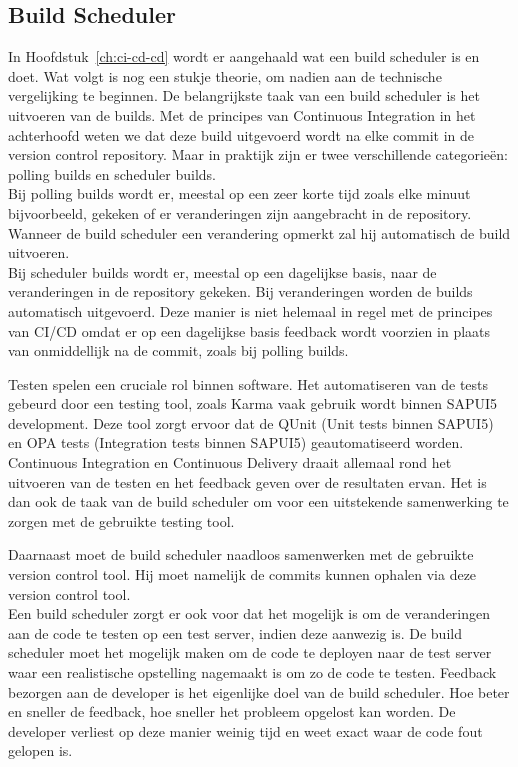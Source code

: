        \subsection{Build Scheduler}
        In Hoofdstuk~\ref{ch:ci-cd-cd} wordt er aangehaald wat een build scheduler is en doet. Wat volgt is nog een stukje theorie, om nadien aan de technische vergelijking te beginnen.
        De belangrijkste taak van een build scheduler is het uitvoeren van de builds. Met de principes van Continuous Integration in het achterhoofd weten we dat deze build uitgevoerd wordt na elke commit in de version control repository. Maar in praktijk zijn er twee verschillende categorieën: polling builds en scheduler builds.\\
        Bij polling builds wordt er, meestal op een zeer korte tijd zoals elke minuut bijvoorbeeld, gekeken of er veranderingen zijn aangebracht in de repository. Wanneer de build scheduler een verandering opmerkt zal hij automatisch de build uitvoeren.\\
        Bij scheduler builds wordt er, meestal op een dagelijkse basis, naar de veranderingen in de repository gekeken. Bij veranderingen worden de builds automatisch uitgevoerd. Deze manier is niet helemaal in regel met de principes van CI/CD omdat er op een dagelijkse basis feedback wordt voorzien in plaats van onmiddellijk na de commit, zoals bij polling builds.
        
        Testen spelen een cruciale rol binnen software. Het automatiseren van de tests gebeurd door een testing tool, zoals Karma vaak gebruik wordt binnen SAPUI5 development. Deze tool zorgt ervoor dat de QUnit (Unit tests binnen SAPUI5) en OPA tests (Integration tests binnen SAPUI5) geautomatiseerd worden. Continuous Integration en Continuous Delivery draait allemaal rond het uitvoeren van de testen en het feedback geven over de resultaten ervan. Het is dan ook de taak van de build scheduler om voor een uitstekende samenwerking te zorgen met de gebruikte testing tool.
        
        Daarnaast moet de build scheduler naadloos samenwerken met de gebruikte version control tool. Hij moet namelijk de commits kunnen ophalen via deze version control tool.\\
        Een build scheduler zorgt er ook voor dat het mogelijk is om de veranderingen aan de code te testen op een test server, indien deze aanwezig is. De build scheduler moet het mogelijk maken om de code te deployen naar de test server waar een realistische opstelling nagemaakt is om zo de code te testen.
        Feedback bezorgen aan de developer is het eigenlijke doel van de build scheduler. Hoe beter en sneller de feedback, hoe sneller het probleem opgelost kan worden. De developer verliest op deze manier weinig tijd en weet exact waar de code fout gelopen is.
        
